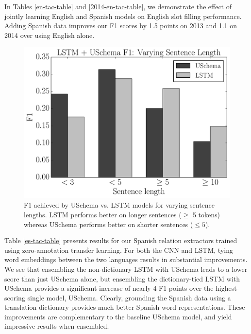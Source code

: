 
In Tables \ref{en-tac-table} and \ref{2014-en-tac-table}, we demonstrate the effect of jointly learning English and Spanish models on English slot filling performance. Adding Spanish data improves our F1 scores by 1.5 points on 2013 and 1.1 on 2014 over using English alone.

\begin{figure}
\includegraphics[scale=0.45]{f1-vary-sent-length}
\caption{F1 achieved by USchema vs. LSTM models for varying sentence lengths. LSTM performs better on longer sentences ($\geq$ 5 tokens) whereas USchema performs better on shorter sentences ($\leq 5$). \label{fig:f1-vary-sents}}
\end{figure}

Table \ref{es-tac-table} presents results for our Spanish relation extractors trained using zero-annotation transfer learning. For both the CNN and LSTM, tying word embeddings between the two languages results in substantial improvements. We see that ensembling the non-dictionary LSTM with USchema leads to a lower score than just USchema alone, but ensembling the dictionary-tied LSTM with USchema provides a significant increase of nearly 4 F1 points over the highest-scoring single model, USchema. Clearly, grounding the Spanish data using a translation dictionary provides much better Spanish word representations. These improvements are complementary to the baseline USchema model, and yield impressive results when ensembled. 


